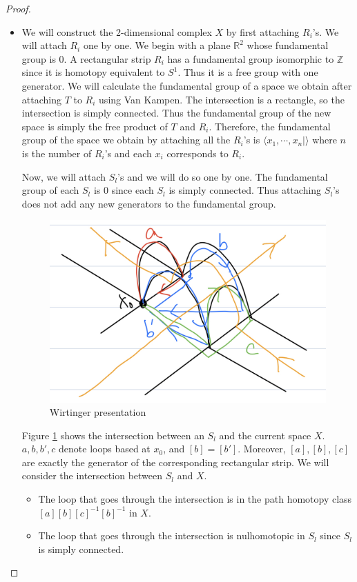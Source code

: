 \documentclass[12pt, psamsfonts]{amsart}
\theoremstyle{definition}
\theoremstyle{remark}
\numberwithin{equation}{section}
\begin{document}
\begin{proof}
  $ $
  \begin{itemize}
    \item
      We will construct the 2-dimensional complex $X$ by first attaching $R_i$'s.
      We will attach $R_i$ one by one.
      We begin with a plane $\mathbb{R}^2$ whose fundamental group is $0$.
      A rectangular strip $R_i$ has a fundamental group isomorphic to $\mathbb{Z}$ since it is homotopy equivalent to $S^1$.
      Thus it is a free group with one generator.
      We will calculate the fundamental group of a space we obtain after attaching $T$ to $R_i$ using Van Kampen.
      The intersection is a rectangle, so the intersection is simply connected.
      Thus the fundamental group of the new space is simply the free product of $T$ and $R_i$.
      Therefore, the fundamental group of the space we obtain by attaching all the $R_i$'s is $\langle x_1, \cdots, x_n \mid \rangle$ where $n$ is the number of $R_i$'s and each $x_i$ corresponds to $R_i$.

      Now, we will attach $S_l$'s and we will do so one by one.
      The fundamental group of each $S_l$ is $0$ since each $S_l$ is simply connected.
      Thus attaching $S_l$'s does not add any new generators to the fundamental group.
      \begin{figure}
        \includegraphics[width=.5\linewidth]{wirtinger.jpeg}
        \caption{Wirtinger presentation}
        \label{fig:wirtinger}
      \end{figure}
      Figure \ref{fig:wirtinger} shows the intersection between an $S_l$ and the current space $X$.
      $a, b, b', c$ denote loops based at $x_0$, and $[b] = [b']$.
      Moreover, $[a], [b], [c]$ are exactly the generator of the corresponding rectangular strip.
      We will consider the intersection between $S_l$ and $X$.
      \begin{itemize}
        \item
          The loop that goes through the intersection is in the path homotopy class $[a][b][c]^{-1}[b]^{-1}$ in $X$.
        \item
          The loop that goes through the intersection is nulhomotopic in $S_l$ since $S_l$ is simply connected.
      \end{itemize}


\end{itemize}
\end{proof}
\end{document}
